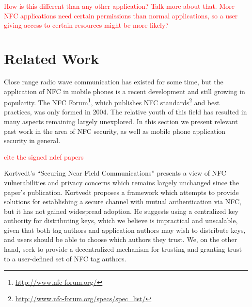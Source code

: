 \documentclass[12pt]{article}
\newcommand\TODO[1]{\textcolor{red}{#1}}
\begin{document}
\TODO{How is this different than any other application? Talk more about that. More NFC applications need certain permissions than normal applications, so a user giving access to certain resources might be more likely?}


\section{Related Work}
Close range radio wave communication has existed for some time, but the application of NFC in mobile phones is a recent development and still growing in popularity.
The NFC Forum\footnote{\url{http://www.nfc-forum.org/}}, which publishes NFC standards\footnote{\url{http://www.nfc-forum.org/specs/spec_list/}} and best practices, was only formed in 2004.
The relative youth of this field has resulted in many aspects remaining largely unexplored.
In this section we present relevant past work in the area of NFC security, as well as mobile phone application security in general.

\TODO{cite the signed ndef papers}

Kortvedt's ``Securing Near Field Communications''\cite{kortvedt2009} presents a view of NFC vulnerabilities and privacy concerns which remains largely unchanged since the paper's publication.
Kortvedt proposes a framework which attempts to provide solutions for establishing a secure channel with mutual authentication via NFC, but it has not gained widespread adoption.
He suggests using a centralized key authority for distributing keys, which we believe is impractical and unscalable, given that both tag authors and application authors may wish to distribute keys, and users should be able to choose which authors they trust.
We, on the other hand, seek to provide a decentralized mechanism for trusting and granting trust to a user-defined set of NFC tag authors.
\end{document}
